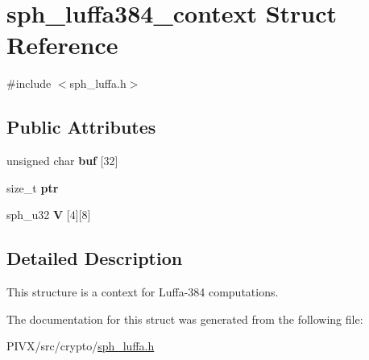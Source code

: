 \hypertarget{structsph__luffa384__context}{}\section{sph\+\_\+luffa384\+\_\+context Struct Reference}
\label{structsph__luffa384__context}


{\ttfamily \#include $<$sph\+\_\+luffa.\+h$>$}

\subsection*{Public Attributes}
\begin{DoxyCompactItemize}
\item 
\mbox{\label{structsph__luffa384__context_a48cac0d215386fd163afc273331427a1}} 
unsigned char {\bfseries buf} \mbox{[}32\mbox{]}
\item 
\mbox{\label{structsph__luffa384__context_ab0c41fc53539b3b1499e0900459e4311}} 
size\+\_\+t {\bfseries ptr}
\item 
\mbox{\label{structsph__luffa384__context_a1e3f11fe357732f2e5aee05ad5c6e6d9}} 
sph\+\_\+u32 {\bfseries V} \mbox{[}4\mbox{]}\mbox{[}8\mbox{]}
\end{DoxyCompactItemize}


\subsection{Detailed Description}
This structure is a context for Luffa-\/384 computations. 

The documentation for this struct was generated from the following file\+:\begin{DoxyCompactItemize}
\item 
P\+I\+V\+X/src/crypto/\mbox{\hyperlink{sph__luffa_8h}{sph\+\_\+luffa.\+h}}\end{DoxyCompactItemize}
